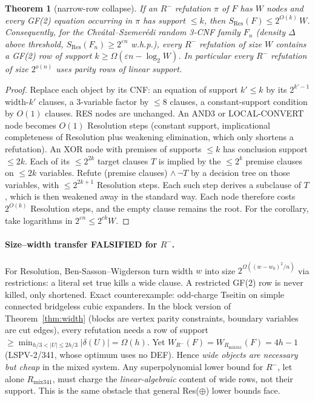 \documentclass[11pt]{article}
\newtheorem{theorem}{Theorem}
\begin{document}
\begin{theorem}[narrow-row collapse]\label{thm:collapse}
If an $R^-$ refutation $\pi$ of $F$ has $W$ nodes and every GF(2) equation occurring in $\pi$ has support $\le k$, then $S_{\mathrm{Res}}(F)\le 2^{O(k)}\,W$.
Consequently, for the Chv\'atal--Szemer\'edi random 3-CNF family $F_n$ (density $\Delta$ above threshold, $S_{\mathrm{Res}}(F_n)\ge2^{\varepsilon n}$ w.h.p.), every $R^-$ refutation of size $W$ contains a GF(2) row of support $k\ge \Omega(\varepsilon n-\log_2 W)$. In particular every $R^-$ refutation of size $2^{o(n)}$ uses parity rows of linear support.
\end{theorem}
\begin{proof}
Replace each object by its CNF: an equation of support $k'\le k$ by its $2^{k'-1}$ width-$k'$ clauses, a 3-variable factor by $\le8$ clauses, a constant-support condition by $O(1)$ clauses. RES nodes are unchanged. An AND3 or LOCAL-CONVERT node becomes $O(1)$ Resolution steps (constant support, implicational completeness of Resolution plus weakening elimination, which only shortens a refutation). An XOR node with premises of supports $\le k$ has conclusion support $\le 2k$. Each of its $\le 2^{2k}$ target clauses $T$ is implied by the $\le 2^{k}$ premise clauses on $\le 2k$ variables. Refute (premise clauses) $\wedge\,\neg T$ by a decision tree on those variables, with $\le 2^{2k+1}$ Resolution steps. Each such step derives a subclause of $T$, which is then weakened away in the standard way. Each node therefore costs $2^{O(k)}$ Resolution steps, and the empty clause remains the root. For the corollary, take logarithms in $2^{\varepsilon n}\le 2^{ck}W$.
\end{proof}

\paragraph{Size--width transfer FALSIFIED for $R^-$.} For Resolution, Ben-Sasson--Wigderson turn width $w$ into size $2^{\Omega((w-w_0)^2/n)}$ via restrictions: a literal set true kills a wide clause. A restricted GF(2) row is never killed, only shortened. Exact counterexample: odd-charge Tseitin on simple connected bridgeless cubic expanders. In the block version of Theorem~\ref{thm:width} (blocks are vertex parity constraints, boundary variables are cut edges), every refutation needs a row of support $\ge\min_{h/3<|U|\le2h/3}|\delta(U)|=\Omega(h)$. Yet $W_{R^-}(F)=W_{R_{\mathrm{mix341}}}(F)=4h-1$ (LSPV-2/341, whose optimum uses no DEF). Hence \emph{wide objects are necessary but cheap} in the mixed system. Any superpolynomial lower bound for $R^-$, let alone $R_{\mathrm{mix341}}$, must charge the \emph{linear-algebraic} content of wide rows, not their support. This is the same obstacle that general Res($\oplus$) lower bounds face.
\end{document}
